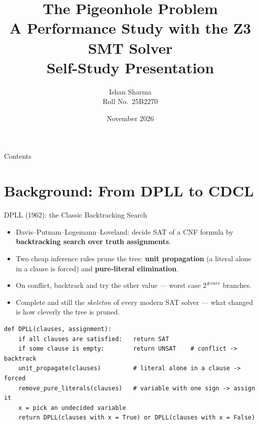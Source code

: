 \documentclass[10pt,aspectratio=169,xcolor={table}]{beamer}
\title[Pigeonhole with Z3]{The Pigeonhole Problem\\[1mm]\large A Performance Study with the Z3 SMT Solver\\[2mm]{\normalsize Self-Study Presentation}}
\author[I.~Sharma \textbar\ 25B2270]{Ishan Sharma\\[1mm]{\small Roll No.\ 25B2270}}
\institute[IIT Bombay]{Indian Institute of Technology Bombay}
\date{November 2026}
\begin{document}
\begin{frame}
  \titlepage
\end{frame}

\begin{frame}{Contents}
  \tableofcontents
\end{frame}

\section{Background: From DPLL to CDCL}

\begin{frame}[fragile]{DPLL (1962): the Classic Backtracking Search}
  \begin{itemize}\itemsep2pt
    \item Davis--Putnam--Logemann--Loveland: decide SAT of a CNF
          formula by \textbf{backtracking search over truth
          assignments}.
    \item Two cheap inference rules prune the tree:
          \textbf{unit propagation} (a literal alone in a clause
          is forced) and \textbf{pure-literal elimination}.
    \item On conflict, backtrack and try the other value ---
          worst case $2^{\#vars}$ branches.
    \item Complete and still the \emph{skeleton} of every modern
          SAT solver --- what changed is how cleverly the tree is
          pruned.
  \end{itemize}
\begin{lstlisting}[basicstyle=\ttfamily\scriptsize,frame=single,rulecolor=\color{black!30}]
def DPLL(clauses, assignment):
    if all clauses are satisfied:   return SAT
    if some clause is empty:        return UNSAT    # conflict -> backtrack
    unit_propagate(clauses)         # literal alone in a clause -> forced
    remove_pure_literals(clauses)   # variable with one sign -> assign it
    x = pick an undecided variable
    return DPLL(clauses with x = True) or DPLL(clauses with x = False)
\end{lstlisting}
\end{frame}
\end{document}

